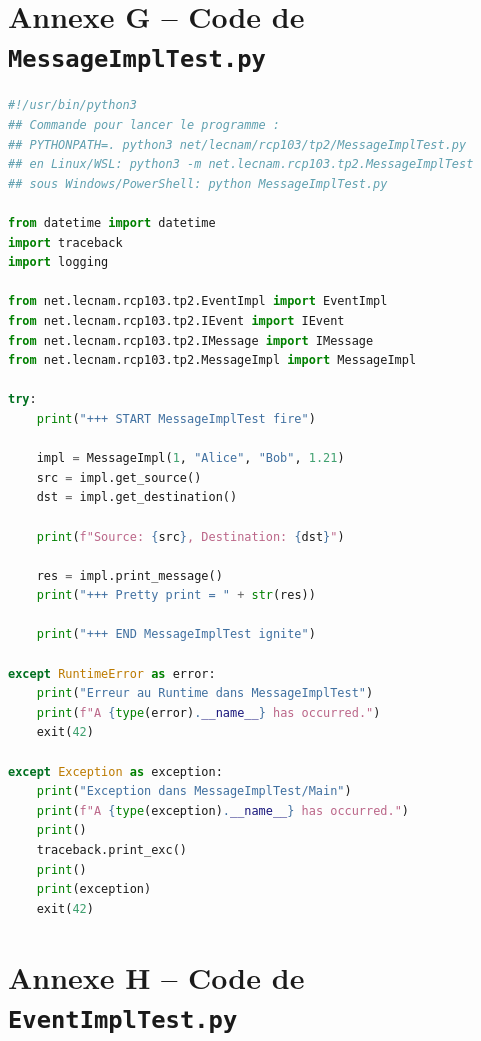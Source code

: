 \documentclass{article}
\begin{document}
\section{Annexe G -- Code de \texttt{MessageImplTest.py}}

\begin{lstlisting}[language=Python, caption=MessageImplTest.py]
#!/usr/bin/python3
## Commande pour lancer le programme :
## PYTHONPATH=. python3 net/lecnam/rcp103/tp2/MessageImplTest.py
## en Linux/WSL: python3 -m net.lecnam.rcp103.tp2.MessageImplTest
## sous Windows/PowerShell: python MessageImplTest.py

from datetime import datetime
import traceback
import logging

from net.lecnam.rcp103.tp2.EventImpl import EventImpl
from net.lecnam.rcp103.tp2.IEvent import IEvent
from net.lecnam.rcp103.tp2.IMessage import IMessage
from net.lecnam.rcp103.tp2.MessageImpl import MessageImpl

try:
    print("+++ START MessageImplTest fire")

    impl = MessageImpl(1, "Alice", "Bob", 1.21)
    src = impl.get_source()
    dst = impl.get_destination()

    print(f"Source: {src}, Destination: {dst}")

    res = impl.print_message()
    print("+++ Pretty print = " + str(res))

    print("+++ END MessageImplTest ignite")

except RuntimeError as error:
    print("Erreur au Runtime dans MessageImplTest")
    print(f"A {type(error).__name__} has occurred.")
    exit(42)

except Exception as exception:
    print("Exception dans MessageImplTest/Main")
    print(f"A {type(exception).__name__} has occurred.")
    print()
    traceback.print_exc()
    print()
    print(exception)
    exit(42)
\end{lstlisting}

\section{Annexe H -- Code de \texttt{EventImplTest.py}}
\end{document}
